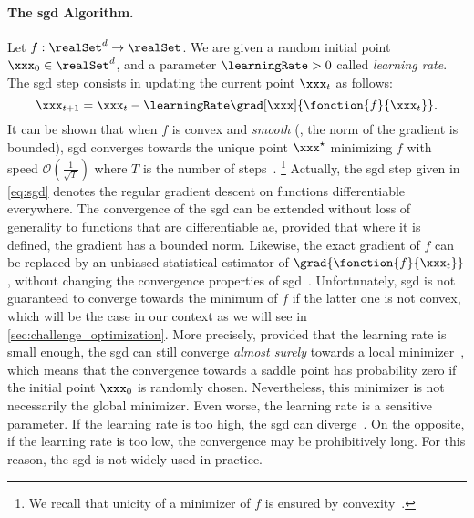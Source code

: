 \paragraph{The \gls{sgd} Algorithm.}
Let \(f: \realSet^d \rightarrow \realSet\).
We are given a random initial point \(\xxx_0 \in \realSet^d\), and a parameter \(\learningRate > 0\) called \emph{learning rate}.
The \gls{sgd} step consists in updating the current point \(\xxx_t\) as follows:
\begin{equation}
    \xxx_{t+1} = \xxx_t - \learningRate \grad[\xxx]{\fonction{f}{\xxx_t}}.
    \label{eq:sgd}
\end{equation}
It can be shown that when \(f\) is convex and \emph{smooth} (\ie{}, the norm of the gradient is bounded), \gls{sgd} converges towards the unique point \(\xxx^{\star}\) minimizing \(f\) with speed \(\mathcal{O}\left(\frac{1}{\sqrt{T}}\right)\) where \(T\) is the number of steps~\cite[Thm.~14.8]{shalev-shwartz_understanding_2014}.%
\footnote{We recall that unicity of a minimizer of \(f\) is ensured by convexity~\cite[Sec.~4.2.2]{boyd_convex_2004}.}
Actually, the \gls{sgd} step given in \autoref{eq:sgd} denotes the regular gradient descent on functions differentiable everywhere.
The convergence of the \gls{sgd} can be extended without loss of generality to functions that are differentiable \gls{ae}, provided that where it is defined, the gradient has a bounded norm.
Likewise, the exact gradient of \(f\) can be replaced by an unbiased statistical estimator of \(\grad{\fonction{f}{\xxx_t}}\), without changing the convergence properties of \gls{sgd}~\cite[Thm.~14.8]{shalev-shwartz_understanding_2014}.
Unfortunately, \gls{sgd} is not guaranteed to converge towards the minimum of \(f\) if the latter one is not convex, which will be the case in our context as we will see in \autoref{sec:challenge_optimization}.
More precisely, provided that the learning rate is small enough, the \gls{sgd} can still converge \emph{almost surely} towards a local minimizer~\cite{lee_gradient_2016}, which means that the convergence towards a saddle point has probability zero if the initial point \(\xxx_0\) is randomly chosen.
Nevertheless, this minimizer is not necessarily the global minimizer.
Even worse, the learning rate is a sensitive parameter.
If the learning rate is too high, the \gls{sgd} can diverge~\cite[Sec.~9.3]{boyd_convex_2004}.
On the opposite, if the learning rate is too low, the convergence may be prohibitively long.
For this reason, the \gls{sgd} is not widely used in practice.


